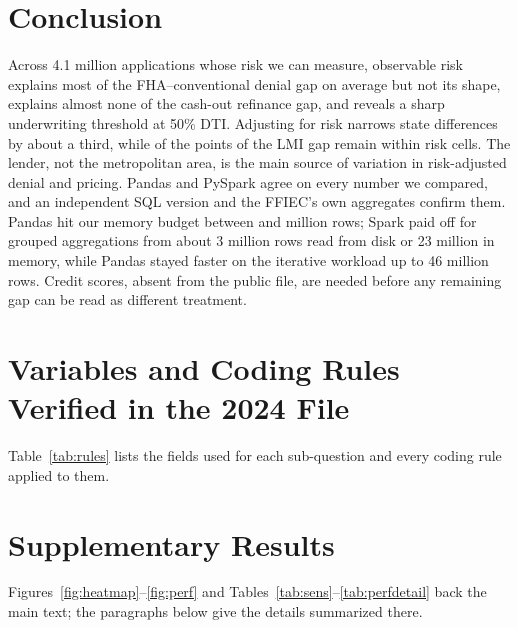 \documentclass[acmtog,nonacm]{acmart}
\begin{document}
\section{Conclusion}

Across 4.1 million applications whose risk we can measure, observable risk explains most of the FHA--conventional denial gap on average but not its shape, explains almost none of the cash-out refinance gap, and reveals a sharp underwriting threshold at 50\% DTI. Adjusting for risk narrows state differences by about a third, while \kgLMIrate{} of the \kgLMIgap{} points of the LMI gap remain within risk cells. The lender, not the metropolitan area, is the main source of variation in risk-adjusted denial and pricing. Pandas and PySpark agree on every number we compared, and an independent SQL version and the FFIEC's own aggregates confirm them. Pandas hit our memory budget between \lastRows{} and \oomRows{} million rows; Spark paid off for grouped aggregations from about 3 million rows read from disk or 23 million in memory, while Pandas stayed faster on the iterative workload up to 46 million rows. Credit scores, absent from the public file, are needed before any remaining gap can be read as different treatment.

\clearpage
\setcounter{dbltopnumber}{4}
\renewcommand{\dbltopfraction}{0.9}
\renewcommand{\topfraction}{0.9}
\renewcommand{\textfraction}{0.07}
\renewcommand{\dblfloatpagefraction}{0.3}
\renewcommand{\floatpagefraction}{0.3}
\makeatletter\setlength{\@dblfptop}{0pt}\setlength{\@dblfpsep}{10pt plus 6pt}\setlength{\@dblfpbot}{0pt plus 1fil}\makeatother




\appendix

\section{Variables and Coding Rules Verified in the 2024 File}\label{app:rules}

Table~\ref{tab:rules} lists the fields used for each sub-question and every coding rule applied to them.

\section{Supplementary Results}\label{app:supp}

Figures~\ref{fig:heatmap}--\ref{fig:perf} and Tables~\ref{tab:sens}--\ref{tab:perfdetail} back the main text; the paragraphs below give the details summarized there.
\end{document}
